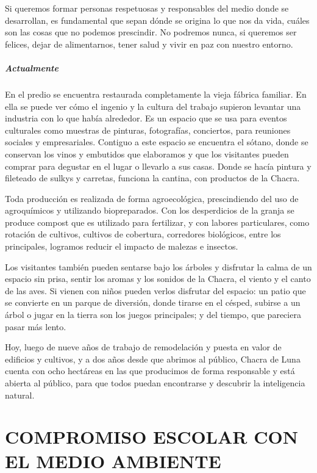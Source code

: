 \documentclass[
]{article}
\begin{document}
Si queremos formar personas respetuosas y responsables del medio donde
se desarrollan, es fundamental que sepan dónde se origina lo que nos da
vida, cuáles son las cosas que no podemos prescindir. No podremos nunca,
si queremos ser felices, dejar de alimentarnos, tener salud y vivir en
paz con nuestro entorno.

\hypertarget{actualmente}{%
\subparagraph{Actualmente}\label{actualmente}}

En el predio se encuentra restaurada completamente la vieja fábrica
familiar. En ella se puede ver cómo el ingenio y la cultura del trabajo
supieron levantar una industria con lo que había alrededor. Es un
espacio que se usa para eventos culturales como muestras de pinturas,
fotografías, conciertos, para reuniones sociales y empresariales.
Contiguo a este espacio se encuentra el sótano, donde se conservan los
vinos y embutidos que elaboramos y que los visitantes pueden comprar
para degustar en el lugar o llevarlo a sus casas. Donde se hacía pintura
y fileteado de sulkys y carretas, funciona la cantina, con productos de
la Chacra.

Toda producción es realizada de forma agroecológica, prescindiendo del
uso de agroquímicos y utilizando biopreparados. Con los desperdicios de
la granja se produce compost que es utilizado para fertilizar, y con
labores particulares, como rotación de cultivos, cultivos de cobertura,
corredores biológicos, entre los principales, logramos reducir el
impacto de malezas e insectos.

Los visitantes también pueden sentarse bajo los árboles y disfrutar la
calma de un espacio sin prisa, sentir los aromas y los sonidos de la
Chacra, el viento y el canto de las aves. Si vienen con niños pueden
verlos disfrutar del espacio: un patio que se convierte en un parque de
diversión, donde tirarse en el césped, subirse a un árbol o jugar en la
tierra son los juegos principales; y del tiempo, que pareciera pasar más
lento.

Hoy, luego de nueve años de trabajo de remodelación y puesta en valor de
edificios y cultivos, y a dos años desde que abrimos al público, Chacra
de Luna cuenta con ocho hectáreas en las que producimos de forma
responsable y está abierta al público, para que todos puedan encontrarse
y descubrir la inteligencia natural.

\cleardoublepage

\hypertarget{compromiso-escolar-con-el-medio-ambiente}{%
\section{COMPROMISO ESCOLAR CON EL MEDIO
AMBIENTE}\label{compromiso-escolar-con-el-medio-ambiente}}
\end{document}
